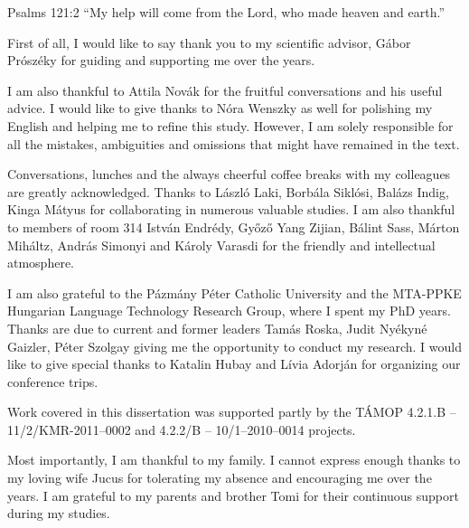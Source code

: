 \begin{chapquote}{Psalms 121:2}
``My help will come from the Lord, who made heaven and earth.''
\end{chapquote}

First of all, I would like to say thank you to my scientific advisor, Gábor Prószéky for guiding and supporting me over the years.

I am also thankful to Attila Novák for the fruitful conversations and his useful advice.
I would like to give thanks to Nóra Wenszky as well for polishing my English and helping me to refine this study.
However, I am solely responsible for all the mistakes, ambiguities and omissions that might have remained in the text.

Conversations, lunches and the always cheerful coffee breaks with my colleagues are greatly acknowledged. 
Thanks to László Laki, Borbála Siklósi, Balázs Indig, Kinga Mátyus for collaborating in numerous valuable studies.
I am also thankful to members of room 314 István Endrédy, Győző Yang Zijian, Bálint Sass, Márton Miháltz, András Simonyi and Károly Varasdi for the friendly and intellectual atmosphere.

I am also grateful to the Pázmány Péter Catholic University and the MTA-PPKE Hungarian Language Technology Research Group, where I spent my PhD years. 
Thanks are due to current and former leaders Tamás Roska, Judit Nyékyné Gaizler, Péter Szolgay giving me the opportunity to conduct my research.
I would like to give special thanks to Katalin Hubay and Lívia Adorján for organizing our conference trips.

Work covered in this dissertation was supported partly by the TÁMOP 4.2.1.B -- 11/2/KMR-2011–0002 and 4.2.2/B -- 10/1–2010–0014 projects.

Most importantly, I am thankful to my family.
I cannot express enough thanks to my loving wife Jucus for tolerating my  absence and encouraging me over the years.
I am grateful to my parents and brother Tomi for their continuous support during my studies.
